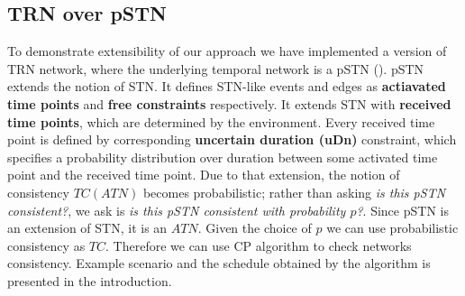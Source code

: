\subsection{TRN over pSTN}
To demonstrate extensibility of our approach we have implemented a version of TRN network, where the underlying temporal network is a pSTN (\cite{Fang2014}). pSTN extends the notion of STN. It defines STN-like events and edges as \textbf{actiavated time points} and \textbf{free constraints} respectively. It extends STN with \textbf{received time points}, which are determined by the environment. Every received time point is defined by corresponding \textbf{uncertain duration (uDn)} constraint, which specifies a probability distribution over duration between some activated time point and the received time point. Due to that extension, the notion of consistency $TC(ATN)$ becomes probabilistic; rather than asking \textit{is this pSTN consistent?}, we ask is \textit{is this pSTN consistent with probability $p$?}. Since pSTN is an extension of STN, it is an $ATN$. Given the choice of $p$ we can use probabilistic consistency as $TC$. Therefore we can use CP algorithm to check networks consistency. Example scenario and the schedule obtained by the algorithm is presented in the introduction.
